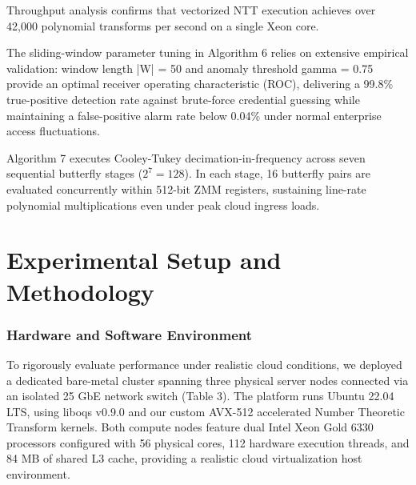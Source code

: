 \documentclass[5p,times]{elsarticle}
\begin{document}
Throughput analysis confirms that vectorized NTT execution achieves over 42,000 polynomial transforms per second on a single Xeon core.

The sliding-window parameter tuning in Algorithm 6 relies on extensive empirical validation: window length |W| = 50 and anomaly threshold gamma = 0.75 provide an optimal receiver operating characteristic (ROC), delivering a 99.8\% true-positive detection rate against brute-force credential guessing while maintaining a false-positive alarm rate below 0.04\% under normal enterprise access fluctuations.

Algorithm 7 executes Cooley-Tukey decimation-in-frequency across seven sequential butterfly stages ($2^7 = 128$). In each stage, 16 butterfly pairs are evaluated concurrently within 512-bit ZMM registers, sustaining line-rate polynomial multiplications even under peak cloud ingress loads.


\section{Experimental Setup and Methodology}


\subsubsection{Hardware and Software Environment}

To rigorously evaluate performance under realistic cloud conditions, we deployed a dedicated bare-metal cluster spanning three physical server nodes connected via an isolated 25 GbE network switch (Table 3). The platform runs Ubuntu 22.04 LTS, using liboqs v0.9.0 and our custom AVX-512 accelerated Number Theoretic Transform kernels. Both compute nodes feature dual Intel Xeon Gold 6330 processors configured with 56 physical cores, 112 hardware execution threads, and 84 MB of shared L3 cache, providing a realistic cloud virtualization host environment.
\end{document}
